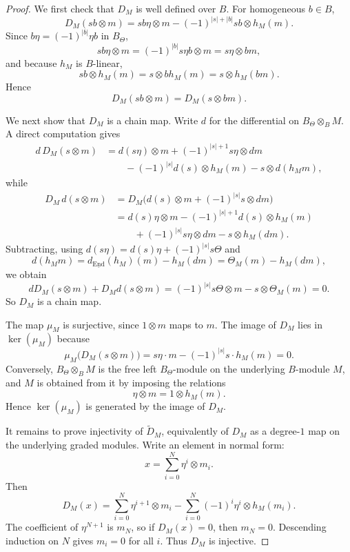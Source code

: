 \begin{proof}
We first check that \(D_{M}\) is well defined over \(B\).
For homogeneous \(b\in B\),
\[
D_{M}(sb\otimes m)
=
sb\eta\otimes m-(-1)^{|s|+|b|}sb\otimes h_{M}(m).
\]
Since \(b\eta=(-1)^{|b|}\eta b\) in \(B_{\Theta}\),
\[
sb\eta\otimes m=(-1)^{|b|}s\eta b\otimes m=s\eta\otimes bm,
\]
and because \(h_{M}\) is \(B\)-linear,
\[
sb\otimes h_{M}(m)=s\otimes bh_{M}(m)=s\otimes h_{M}(bm).
\]
Hence
\[
D_{M}(sb\otimes m)=D_{M}(s\otimes bm).
\]

We next show that \(D_{M}\) is a chain map.
Write \(d\) for the differential on \(B_{\Theta}\otimes_{B}M\).
A direct computation gives
\begin{align*}
d\,D_{M}(s\otimes m)
&=
d(s\eta)\otimes m+(-1)^{|s|+1}s\eta\otimes dm
\\
&\qquad
-(-1)^{|s|}d(s)\otimes h_{M}(m)-s\otimes d(h_{M}m),
\end{align*}
while
\begin{align*}
D_{M}\,d(s\otimes m)
&=
D_{M}\big(d(s)\otimes m+(-1)^{|s|}s\otimes dm\big)
\\
&=
d(s)\eta\otimes m-(-1)^{|s|+1}d(s)\otimes h_{M}(m)
\\
&\qquad
+(-1)^{|s|}s\eta\otimes dm-s\otimes h_{M}(dm).
\end{align*}
Subtracting, using \(d(s\eta)=d(s)\eta+(-1)^{|s|}s\Theta\) and
\[
d(h_{M}m)=d_{\underline{\operatorname{End}}}(h_{M})(m)-h_{M}(dm)=\Theta_{M}(m)-h_{M}(dm),
\]
we obtain
\[
dD_{M}(s\otimes m)+D_{M}d(s\otimes m)=
(-1)^{|s|}s\Theta\otimes m-s\otimes \Theta_{M}(m)=0.
\]
So \(D_{M}\) is a chain map.

The map \(\mu_{M}\) is surjective, since \(1\otimes m\) maps to \(m\).
The image of \(D_{M}\) lies in \(\ker(\mu_{M})\) because
\[
\mu_{M}\big(D_{M}(s\otimes m)\big)
=s\eta\cdot m-(-1)^{|s|}s\cdot h_{M}(m)=0.
\]
Conversely, \(B_{\Theta}\otimes_{B}M\) is the free left \(B_{\Theta}\)-module on the underlying \(B\)-module \(M\), and \(M\) is obtained from it by imposing the relations
\[
\eta\otimes m=1\otimes h_{M}(m).
\]
Hence \(\ker(\mu_{M})\) is generated by the image of \(D_{M}\).

It remains to prove injectivity of \(\widetilde D_{M}\), equivalently of \(D_{M}\) as a degree-\(1\) map on the underlying graded modules.
Write an element in normal form:
\[
x=\sum_{i=0}^{N}\eta^{i}\otimes m_{i}.
\]
Then
\[
D_{M}(x)=\sum_{i=0}^{N}\eta^{i+1}\otimes m_{i}-\sum_{i=0}^{N}(-1)^{i}\eta^{i}\otimes h_{M}(m_{i}).
\]
The coefficient of \(\eta^{N+1}\) is \(m_{N}\), so if \(D_{M}(x)=0\), then \(m_{N}=0\).
Descending induction on \(N\) gives \(m_{i}=0\) for all \(i\).
Thus \(D_{M}\) is injective.
\end{proof}

